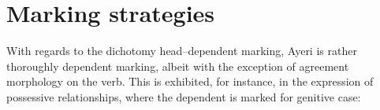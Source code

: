 % 
% 
% 
% 
% 
% 
% 
% 
% 


\section{Marking strategies}

With regards to the dichotomy head--dependent marking, Ayeri is rather  
thoroughly dependent marking, albeit with the exception of agreement 
morphology on the verb. This is exhibited, for instance, in the expression 
of possessive relationships, where the dependent is marked for genitive 
case:

